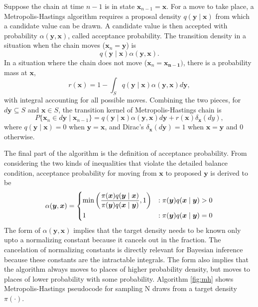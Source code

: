 \documentclass[12pt]{report}
\begin{document}
Suppose the chain at time $n - 1$ is in state $\boldsymbol{x}_{n-1} = \boldsymbol{x}$. For a move to take place, a Metropolis-Hastings algorithm requires a proposal density $q(\boldsymbol{y} \mid \boldsymbol{x})$ from which a candidate value can be drawn. A candidate value is then accepted with probability $\alpha(\boldsymbol{y}, \boldsymbol{x})$, called acceptance probability. The transition density in a situation when the chain moves ($\boldsymbol{x}_n = \boldsymbol{y}$) is
\begin{equation}
q(\boldsymbol{y} \mid \boldsymbol{x})\alpha(\boldsymbol{y}, \boldsymbol{x}).
\end{equation}
In a situation where the chain does not move ($\boldsymbol{x}_n = \boldsymbol{x_{n-1}})$, there is a probability mass at $\boldsymbol{x}$,
\begin{equation}
r(\boldsymbol{x}) = 1 - \int_S q(\boldsymbol{y} \mid \boldsymbol{x})\alpha(\boldsymbol{y}, \boldsymbol{x})d\boldsymbol{y},
\end{equation}
with integral accounting for all possible moves. 
Combining the two pieces, for $d\boldsymbol{y} \subseteq S$ and $\boldsymbol{x} \in S$, the transition kernel of Metropolis-Hastings chain is
\begin{equation}
P\{\boldsymbol{x}_n \in d\boldsymbol{y} \mid \boldsymbol{x}_{n-1}\} = q(\boldsymbol{y} \mid \boldsymbol{x})\alpha(\boldsymbol{y}, \boldsymbol{x})d\boldsymbol{y} + r(\boldsymbol{x})\delta_{\boldsymbol{x}}(dy),
\end{equation}
where $q(\boldsymbol{y} \mid \boldsymbol{x}) = 0$ when $\boldsymbol{y} = \boldsymbol{x}$, and Dirac's $\delta_{\boldsymbol{x}}(d\boldsymbol{y}) = 1$ when $\boldsymbol{x} = \boldsymbol{y}$ and 0 otherwise. 

The final part of the algorithm is the definition of acceptance probability. From considering the two kinds of inequalities that violate the detailed balance condition, acceptance probability for moving from $\boldsymbol{x}$ to proposed $\boldsymbol{y}$ is derived to be
%
\[
\alpha(\boldsymbol{y}, \boldsymbol{x}) =
\begin{dcases}
\min\left(\frac{\pi(\boldsymbol{x})q(\boldsymbol{y} \mid \boldsymbol{x})}{\pi(\boldsymbol{y})q(\boldsymbol{x} \mid \boldsymbol{y})},1\right) & : \pi(\boldsymbol{y})q(\boldsymbol{x} \mid \boldsymbol{y}) > 0 \\
1 & : \pi(\boldsymbol{y})q(\boldsymbol{x} \mid \boldsymbol{y}) = 0
\end{dcases}
\]
%
The form of $\alpha(\boldsymbol{y}, \boldsymbol{x})$ implies that the target density needs to be known only upto a normalizing constant because it cancels out in the fraction. The cancelation of normalizing constants is directly relevant for Bayesian inference because these constants are the intractable integrals. The form also implies that the algorithm always moves to places of higher probability density, but moves to places of lower probability with some probability. Algorithm \ref{fig:mh} shows Metropolis-Hastings pseudocode for sampling N draws from a target density $\pi(\cdot)$.
\end{document}
